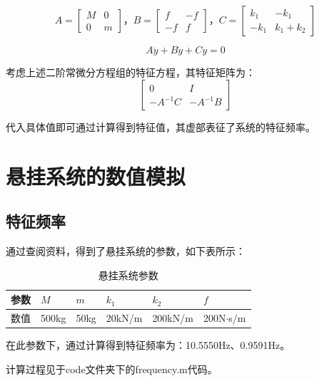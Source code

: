 \documentclass[UTF8, a4paper]{ctexart}
\begin{document}
\[
A=\begin{bmatrix}
    M & 0 \\
    0 & m
\end{bmatrix}，B=\begin{bmatrix}
    f & -f \\
    -f & f
\end{bmatrix}，C=\begin{bmatrix}
    k_1 & -k_1 \\
    -k_1 & k_1 + k_2
\end{bmatrix}
\]

\begin{equation}
    A\ddot{y} + B\dot{y} + Cy = 0
    \label{eq:matrix}
\end{equation}

考虑上述二阶常微分方程组的特征方程，其特征矩阵为：
\[
\begin{bmatrix}
    0 & I \\
    -A^{-1}C & -A^{-1}B
\end{bmatrix}
\]

代入具体值即可通过计算得到特征值，其虚部表征了系统的特征频率。

\section{悬挂系统的数值模拟}

\subsection{特征频率}
通过查阅资料，得到了悬挂系统的参数，如下表所示：
\begin{table}[h]
    \centering
    \begin{tabularx}{\textwidth}{|X|X|X|X|X|X|}
        \hline
        参数 & $M$ & $m$ & $k_1$ & $k_2$ & $f$ \\
        \hline
        数值 & 500kg & 50kg & 20kN/m & 200kN/m & 200N$\cdot$s/m \\
        \hline
    \end{tabularx}
    \caption{悬挂系统参数}
    \label{tab:parameters}
\end{table}

在此参数下，通过计算得到特征频率为：10.5550Hz、0.9591Hz。

计算过程见于code文件夹下的frequency.m代码。
\end{document}
